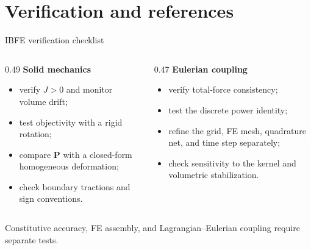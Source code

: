 \documentclass[aspectratio=169,11pt]{beamer}
\newcommand{\Pten}{\bm{P}}
\begin{document}
\section{Verification and references}

\begin{frame}{IBFE verification checklist}
\begin{columns}[T,onlytextwidth]
\begin{column}{0.49\textwidth}
\textbf{Solid mechanics}
\begin{itemize}\itemsep4pt
  \item verify \(J>0\) and monitor volume drift;
  \item test objectivity with a rigid rotation;
  \item compare \(\Pten\) with a closed-form homogeneous deformation;
  \item check boundary tractions and sign conventions.
\end{itemize}
\end{column}
\begin{column}{0.47\textwidth}
\textbf{Eulerian coupling}
\begin{itemize}\itemsep4pt
  \item verify total-force consistency;
  \item test the discrete power identity;
  \item refine the grid, FE mesh, quadrature net, and time step separately;
  \item check sensitivity to the kernel and volumetric stabilization.
\end{itemize}
\end{column}
\end{columns}
\medskip
\begin{punchbox}
\centering
\small Constitutive accuracy, FE assembly, and Lagrangian--Eulerian coupling require separate tests.
\end{punchbox}
\end{frame}
\end{document}
